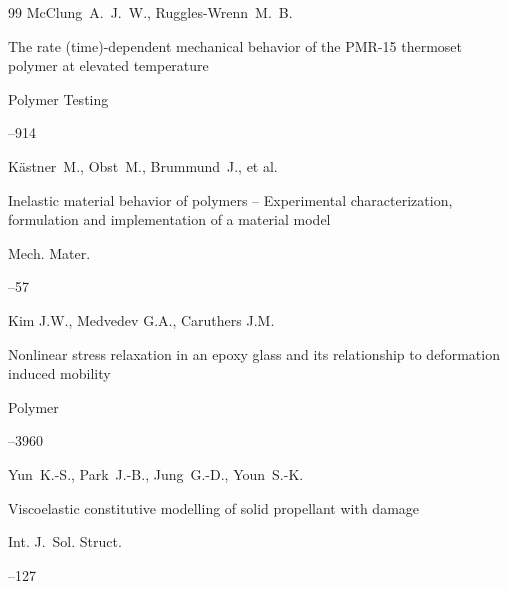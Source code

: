 \begin{thebibliography}{99}
\by McClung~A.~J.~W., Ruggles-Wrenn~M.~B.

\paper The rate (time)-dependent mechanical behavior of the PMR-15 thermoset polymer at elevated temperature 

\jour Polymer Testing




--914







\by K\"astner~M., Obst~M., Brummund~J., et al.

\paper Inelastic material behavior of polymers -- Experimental characterization, formulation and implementation of a material model

\jour Mech. Mater.



--57







\by Kim J.W., Medvedev G.A., Caruthers J.M.

\paper Nonlinear stress relaxation in an epoxy glass and its relationship to deformation induced mobility

\jour Polymer




--3960







\by Yun~K.-S., Park~J.-B., Jung~G.-D., Youn~S.-K.

\paper Viscoelastic constitutive modelling of solid propellant with damage 

\jour Int. J.~Sol. Struct.



--127







\end{thebibliography}
